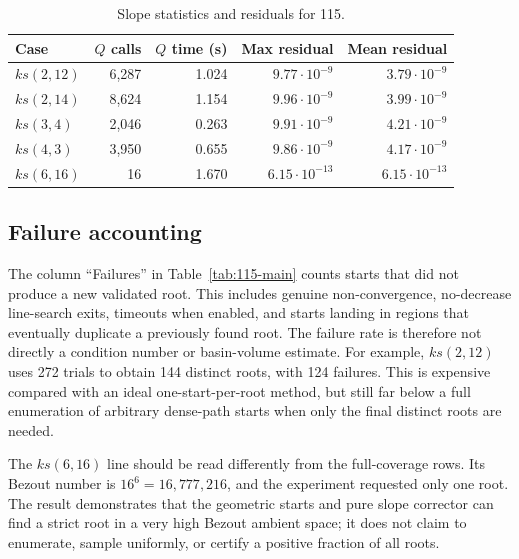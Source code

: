 \documentclass[11pt,a4paper]{article}
\begin{document}
\begin{table}[h]
\centering
\begin{tabular}{lrrrr}
\toprule
Case & \(Q\) calls & \(Q\) time (s) & Max residual & Mean residual\\
\midrule
\(ks(2,12)\) & 6,287 & 1.024 & \(9.77\cdot 10^{-9}\) & \(3.79\cdot 10^{-9}\)\\
\(ks(2,14)\) & 8,624 & 1.154 & \(9.96\cdot 10^{-9}\) & \(3.99\cdot 10^{-9}\)\\
\(ks(3,4)\) & 2,046 & 0.263 & \(9.91\cdot 10^{-9}\) & \(4.21\cdot 10^{-9}\)\\
\(ks(4,3)\) & 3,950 & 0.655 & \(9.86\cdot 10^{-9}\) & \(4.17\cdot 10^{-9}\)\\
\(ks(6,16)\) & 16 & 1.670 & \(6.15\cdot 10^{-13}\) & \(6.15\cdot 10^{-13}\)\\
\bottomrule
\end{tabular}
\caption{Slope statistics and residuals for 115.}
\label{tab:115-q}
\end{table}

\subsection{Failure accounting}
The column ``Failures'' in Table~\ref{tab:115-main} counts starts that did not produce a new validated root. This includes genuine non-convergence, no-decrease line-search exits, timeouts when enabled, and starts landing in regions that eventually duplicate a previously found root. The failure rate is therefore not directly a condition number or basin-volume estimate. For example, \(ks(2,12)\) uses 272 trials to obtain 144 distinct roots, with 124 failures. This is expensive compared with an ideal one-start-per-root method, but still far below a full enumeration of arbitrary dense-path starts when only the final distinct roots are needed.

The \(ks(6,16)\) line should be read differently from the full-coverage rows. Its Bezout number is \(16^6=16{,}777{,}216\), and the experiment requested only one root. The result demonstrates that the geometric starts and pure slope corrector can find a strict root in a very high Bezout ambient space; it does not claim to enumerate, sample uniformly, or certify a positive fraction of all roots.
\end{document}
